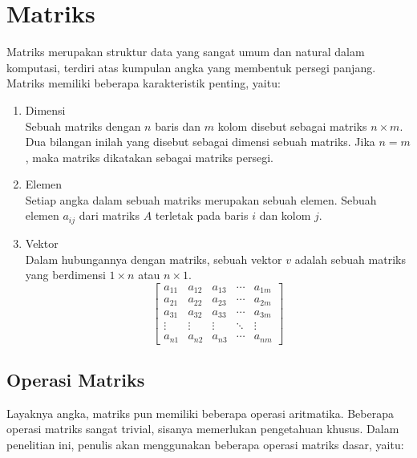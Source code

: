 \section{Matriks}
Matriks merupakan struktur data yang sangat umum dan natural dalam komputasi,
terdiri atas kumpulan angka yang membentuk persegi panjang. Matriks memiliki
beberapa karakteristik penting, yaitu:
\begin{enumerate}[label=\alph*.]
\item Dimensi\\Sebuah matriks dengan $n$ baris dan $m$ kolom disebut sebagai matriks $n\times m$.
Dua bilangan inilah yang disebut sebagai dimensi sebuah matriks. Jika $n = m$, maka
matriks dikatakan sebagai matriks persegi.
\item Elemen\\Setiap angka dalam sebuah matriks merupakan sebuah elemen. Sebuah
elemen $a_{ij}$ dari matriks $A$ terletak pada baris $i$ dan kolom $j$.
\item Vektor\\Dalam hubungannya dengan matriks, sebuah vektor $v$ adalah sebuah
matriks yang berdimensi $1\times n$ atau $n\times 1$.
\[
\begin{bmatrix}
  a_{11} & a_{12} & a_{13} & \cdots & a_{1m} \\
  a_{21} & a_{22} & a_{23} & \cdots & a_{2m} \\
  a_{31} & a_{32} & a_{33} & \cdots & a_{3m} \\
  \vdots  & \vdots  & \vdots & \ddots & \vdots  \\
  a_{n1} & a_{n2} & a_{n3} & \cdots & a_{nm} 
 \end{bmatrix}
 \]
\end{enumerate}

\subsection{Operasi Matriks}
Layaknya angka, matriks pun memiliki beberapa operasi aritmatika. Beberapa
operasi matriks sangat trivial, sisanya memerlukan pengetahuan khusus. Dalam
penelitian ini, penulis akan menggunakan beberapa operasi matriks dasar, yaitu:

